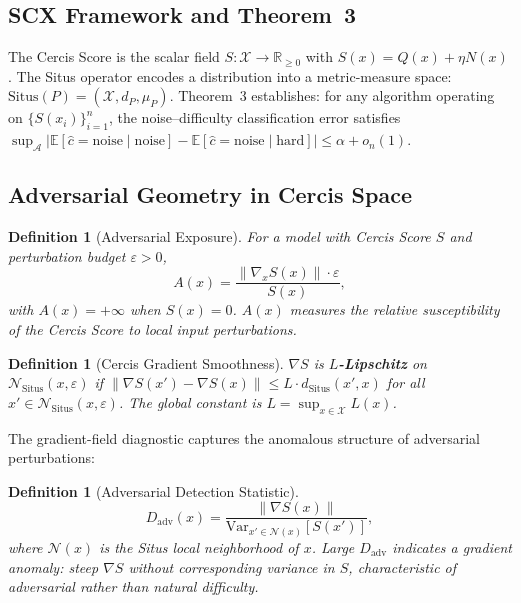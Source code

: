 \documentclass[12pt,a4paper]{article}
\newtheorem{definition}[theorem]{Definition}
\newcommand{\R}{\mathbb{R}}
\newcommand{\E}{\mathbb{E}}
\newcommand{\cX}{\mathcal{X}}
\newcommand{\cN}{\mathcal{N}}
\newcommand{\cA}{\mathcal{A}}
\newcommand{\Situs}{\mathrm{Situs}}
\begin{document}
\subsection{SCX Framework and Theorem~3}

The Cercis Score is the scalar field $S: \cX \to \R_{\geq 0}$ with
$S(x) = Q(x) + \eta N(x)$.  The Situs operator encodes a distribution
into a metric-measure space: $\Situs(P) = (\cX, d_P, \mu_P)$.  Theorem~3
establishes: for any algorithm operating on $\{S(x_i)\}_{i=1}^n$, the
noise--difficulty classification error satisfies
$\sup_{\cA} |\E[\hat{c} = \text{noise} \mid \text{noise}] -
\E[\hat{c} = \text{noise} \mid \text{hard}]| \leq \alpha + o_n(1)$.

\subsection{Adversarial Geometry in Cercis Space}

\begin{definition}[Adversarial Exposure]
\label{def:A}
For a model with Cercis Score $S$ and perturbation budget $\varepsilon > 0$,
\begin{equation}\label{eq:A-def}
    A(x) = \frac{\|\nabla_x S(x)\| \cdot \varepsilon}{S(x)},
\end{equation}
with $A(x) = +\infty$ when $S(x) = 0$.  $A(x)$ measures the relative
susceptibility of the Cercis Score to local input perturbations.
\end{definition}

\begin{definition}[Cercis Gradient Smoothness]
\label{def:lipschitz}
$\nabla S$ is \textbf{$L$-Lipschitz} on $\cN_{\Situs}(x, \varepsilon)$ if
$\|\nabla S(x') - \nabla S(x)\| \leq L \cdot d_{\Situs}(x', x)$ for all
$x' \in \cN_{\Situs}(x, \varepsilon)$.  The global constant is
$L = \sup_{x \in \cX} L(x)$.
\end{definition}

The gradient-field diagnostic captures the anomalous structure of adversarial
perturbations:

\begin{definition}[Adversarial Detection Statistic]
\label{def:D-adv}
\begin{equation}\label{eq:D-adv}
    D_{\mathrm{adv}}(x) =
    \frac{\|\nabla S(x)\|}
         {\mathrm{Var}_{x' \in \mathcal{N}(x)}[S(x')]},
\end{equation}
where $\mathcal{N}(x)$ is the Situs local neighborhood of $x$.  Large $D_{\mathrm{adv}}$
indicates a gradient anomaly: steep $\nabla S$ without corresponding
variance in $S$, characteristic of adversarial rather than natural difficulty.
\end{definition}
\end{document}
